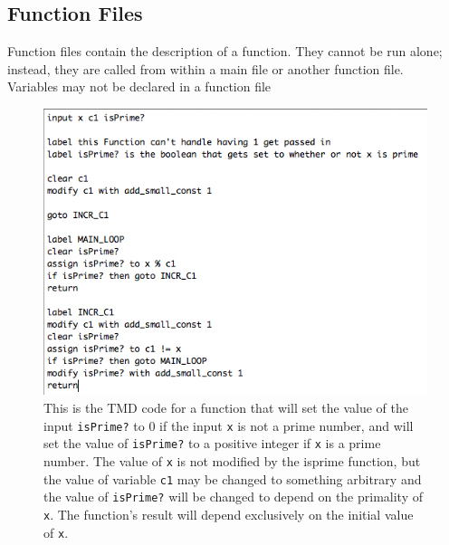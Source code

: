 \documentclass{report}
\begin{document}
\subsection{Function Files}

Function files contain the description of a function. They cannot be run alone; instead, they are called from within a main file or another function file. \\
  
Variables may not be declared in a function file

\begin{figure} 
\begin{center} 
\includegraphics[scale=0.75]{figs/isprime.png} 
\caption{This is the TMD code for a function that will set the value of the input \texttt{isPrime?} to 0 if the input \texttt{x} is not a prime number, and will set the value of \texttt{isPrime?} to a positive integer if \texttt{x} is a prime number. The value of \texttt{x} is not modified by the isprime function, but the value of variable \texttt{c1} may be changed to something arbitrary and the value of \texttt{isPrime?} will be changed to depend on the primality of \texttt{x}. The function's result will depend exclusively on the initial value of \texttt{x}. \label{fig:isprime}} 
\end{center} 
\end{figure}
\end{document}
